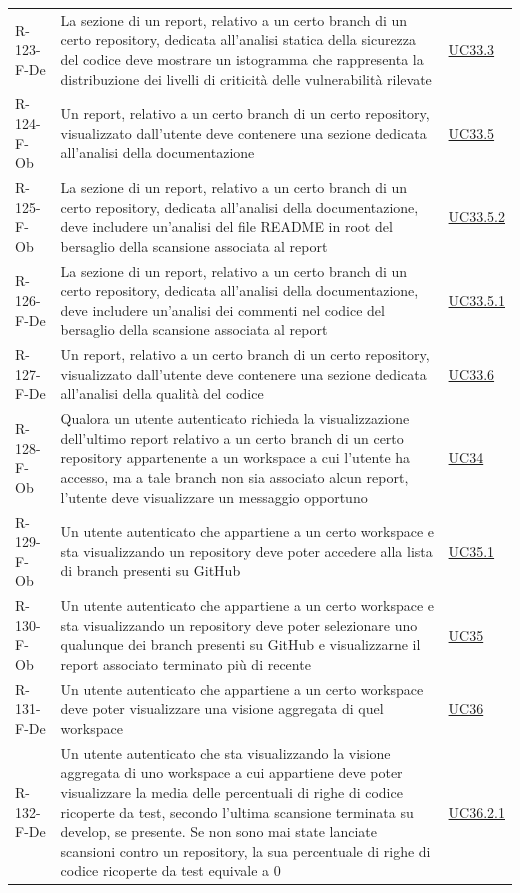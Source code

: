 \documentclass[a4paper, 11pt]{article}
\begin{document}
\begin{longtable}[c]{ >{\centering\arraybackslash}m{2.5cm} >{\centering\arraybackslash}m{8.3cm} >{\centering\arraybackslash}m{3.5cm} }
    R-123-F-De & La sezione di un report, relativo a un certo branch di un certo repository, dedicata all'analisi statica della sicurezza del codice deve mostrare un istogramma che rappresenta la distribuzione dei livelli di criticità delle vulnerabilità rilevate & \hyperref[UC33.3]{UC33.3}\\
    R-124-F-Ob & Un report, relativo a un certo branch di un certo repository, visualizzato dall'utente deve contenere una sezione dedicata all'analisi della documentazione & \hyperref[UC33.5]{UC33.5}\\
    R-125-F-Ob & La sezione di un report, relativo a un certo branch di un certo repository, dedicata all'analisi della documentazione, deve includere un'analisi del file README in root del bersaglio della scansione associata al report & \hyperref[UC33.5.2]{UC33.5.2}\\
    R-126-F-De & La sezione di un report, relativo a un certo branch di un certo repository, dedicata all'analisi della documentazione, deve includere un'analisi dei commenti nel codice del bersaglio della scansione associata al report & \hyperref[UC33.5.1]{UC33.5.1}\\
    R-127-F-De & Un report, relativo a un certo branch di un certo repository, visualizzato dall'utente deve contenere una sezione dedicata all'analisi della qualità del codice & \hyperref[UC33.6]{UC33.6}\\
    R-128-F-Ob & Qualora un utente autenticato richieda la visualizzazione dell'ultimo report relativo a un certo branch di un certo repository appartenente a un workspace a cui l'utente ha accesso, ma a tale branch non sia associato alcun report, l'utente deve visualizzare un messaggio opportuno & \hyperref[UC34]{UC34}\\
    R-129-F-Ob & Un utente autenticato che appartiene a un certo workspace e sta visualizzando un repository deve poter accedere alla lista di branch presenti su GitHub & \hyperref[UC35.1]{UC35.1}\\
    R-130-F-Ob & Un utente autenticato che appartiene a un certo workspace e sta visualizzando un repository deve poter selezionare uno qualunque dei branch presenti su GitHub e visualizzarne il report associato terminato più di recente & \hyperref[UC35]{UC35}\\
    R-131-F-De & Un utente autenticato che appartiene a un certo workspace deve poter visualizzare una visione aggregata di quel workspace & \hyperref[UC36]{UC36}\\
    R-132-F-De & Un utente autenticato che sta visualizzando la visione aggregata di uno workspace a cui appartiene deve poter visualizzare la media delle percentuali di righe di codice ricoperte da test, secondo l'ultima scansione terminata su develop, se presente. Se non sono mai state lanciate scansioni contro un repository, la sua percentuale di righe di codice ricoperte da test equivale a 0 & \hyperref[UC36.2.1]{UC36.2.1}\\

\end{longtable}
\end{document}
